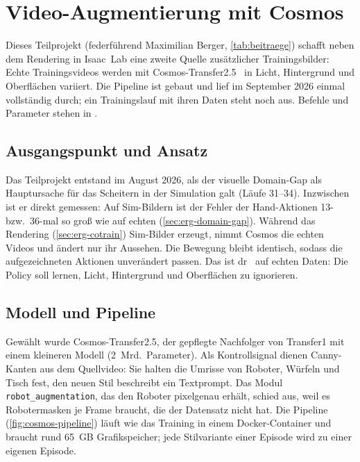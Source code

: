 
\chapter{Video-Augmentierung mit Cosmos}
\label{chap:cosmos}
\label{sec:augmentierung}

Dieses Teilprojekt (federführend Maximilian Berger, \cref{tab:beitraege}) schafft neben dem
Rendering in Isaac~Lab eine zweite Quelle zusätzlicher Trainingsbilder: Echte Trainingsvideos
werden mit Cosmos-Transfer2.5~\cite{cosmostransfer2025} in Licht, Hintergrund und Oberflächen
variiert. Die Pipeline ist gebaut und lief im September 2026 einmal vollständig durch; ein
Trainingslauf mit ihren Daten steht noch aus. Befehle und Parameter stehen in
.

\section{Ausgangspunkt und Ansatz}
\label{sec:cosmos-motivation}
\label{sec:cosmos-ansatz}

Das Teilprojekt entstand im August 2026, als der visuelle Domain-Gap als Hauptursache für das
Scheitern in der Simulation galt (Läufe 31--34). Inzwischen ist er direkt gemessen: Auf
Sim-Bildern ist der Fehler der Hand-Aktionen 13- bzw.\ 36-mal so groß wie auf echten
(\cref{sec:erg-domain-gap}). Während das Rendering (\cref{sec:erg-cotrain}) Sim-Bilder erzeugt,
nimmt Cosmos die echten Videos und ändert nur ihr Aussehen. Die Bewegung bleibt identisch,
sodass die aufgezeichneten Aktionen unverändert passen. Das ist \ac{dr}~\cite{tobin2017domain}
auf echten Daten: Die Policy soll lernen, Licht, Hintergrund und Oberflächen zu ignorieren.

\section{Modell und Pipeline}
\label{sec:cosmos-modell}
\label{sec:cosmos-pipeline}

Gewählt wurde Cosmos-Transfer2.5, der gepflegte Nachfolger von Transfer1 mit einem kleineren
Modell (2~Mrd.\ Parameter). Als Kontrollsignal dienen Canny-Kanten aus dem Quellvideo: Sie halten
die Umrisse von Roboter, Würfeln und Tisch fest, den neuen Stil beschreibt ein Textprompt. Das
Modul \texttt{robot\_augmentation}, das den Roboter pixelgenau erhält, schied aus, weil es
Robotermasken je Frame braucht, die der Datensatz nicht hat. Die Pipeline
(\cref{fig:cosmos-pipeline}) läuft wie das Training in einem Docker-Container und braucht rund
65~GB Grafikspeicher; jede Stilvariante einer Episode wird zu einer eigenen Episode.

